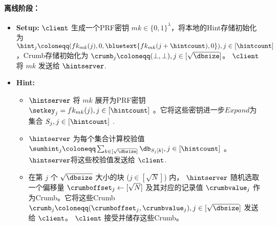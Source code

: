 \begin{mdframed}
        \paragraph{离线阶段：}
        \begin{itemize}
            \item \textbf{Setup:} $\client$ 生成一个PRF密钥 $mk\in\{0,1\}^\lambda$，将本地的Hint存储初始化为 $\hint_j\coloneqq(fk_{mk}(j),0,\bluetext{fk_{mk}(j+\hintcount),0}), j\in [\hintcount]$，Crumb存储初始化为 $\crumb_j\coloneqq (\bot,\bot), j\in [\sqrt{\dbsize}]$。 $\client$ 将 $mk$ 发送给 $\hintserver$.
            \item \textbf{Hint:}
                  \begin{itemize}
                      \item $\hintserver$ 将 $mk$ 展开为PRF密钥 $\setkey_j=fk_{mk}(j), j\in[\hintcount]$ 。它将这些密钥进一步$Expand$为集合 $S_j, j\in[\hintcount]$ .
                      \item $\hintserver$ 为每个集合计算校验值 $\sumhint_j\coloneqq \sum_{k\in [\sqrt{\dbsize}]}\db_{S_{j}[k]}, j\in[\hintcount]$ 。$\hintserver$将这些校验值发送给 $\client$.
                      \item 在第 $j$ 个 $\sqrt{\dbsize}$ 大小的块 ($j\in[\sqrt{N}]$) 内， $\hintserver$ 随机选取一个偏移量 $\crumboffset_j\leftarrow [\sqrt{N}]$ 及其对应的记录值 $\crumbvalue_j$ 作为Crumb。它将这些Crumb $\crumb_j \coloneqq  (\crumboffset_j, \crumbvalue_j), j\in [\sqrt{\dbsize}]$ 发送给 $\client$。 $\client$ 接受并储存这些Crumb。
                  \end{itemize}
        \end{itemize}

\end{mdframed}
